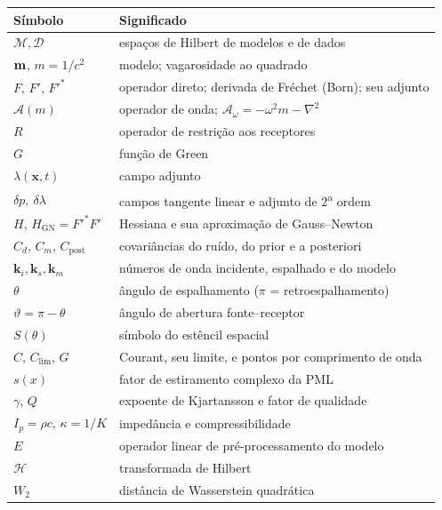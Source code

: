 \documentclass[11pt,a4paper,oneside]{report}
\begin{document}
\begin{center}
\begin{longtable}{@{}ll@{}}
\toprule
\textbf{S\'imbolo} & \textbf{Significado} \\
\midrule
\endhead
$\mathcal{M},\mathcal{D}$ & espa\c{c}os de Hilbert de modelos e de dados \\
$\mathbf{m}$, $m = 1/c^{2}$ & modelo; vagarosidade ao quadrado \\
$F$, $F'$, $F'^{*}$ & operador direto; derivada de Fr\'echet (Born); seu adjunto \\
$\mathcal{A}(m)$ & operador de onda; $\mathcal{A}_\omega = -\omega^{2}m-\nabla^{2}$ \\
$R$ & operador de restri\c{c}\~ao aos receptores \\
$G$ & fun\c{c}\~ao de Green \\
$\lambda(\mathbf{x},t)$ & campo adjunto \\
$\delta p,\ \delta\lambda$ & campos tangente linear e adjunto de 2\textsuperscript{a} ordem \\
$H$, $H_{\text{GN}} = F'^{*}F'$ & Hessiana e sua aproxima\c{c}\~ao de Gauss--Newton \\
$C_d$, $C_m$, $C_{\text{post}}$ & covari\^ancias do ru\'ido, do prior e a posteriori \\
$\mathbf{k}_i,\mathbf{k}_s,\mathbf{k}_m$ & n\'umeros de onda incidente,
  espalhado e do modelo \\
$\theta$ & \^angulo de espalhamento ($\pi$ = retroespalhamento) \\
$\vartheta = \pi-\theta$ & \^angulo de abertura fonte--receptor \\
$S(\theta)$ & s\'imbolo do est\^encil espacial \\
$C$, $C_{\lim}$, $G$ & Courant, seu limite, e pontos por comprimento de onda \\
$s(x)$ & fator de estiramento complexo da PML \\
$\gamma$, $Q$ & expoente de Kjartansson e fator de qualidade \\
$I_p = \rho c$, $\kappa = 1/K$ & imped\^ancia e compressibilidade \\
$E$ & operador linear de pr\'e-processamento do modelo \\
$\mathcal{H}$ & transformada de Hilbert \\
$W_2$ & dist\^ancia de Wasserstein quadr\'atica \\
\bottomrule
\end{longtable}
\end{center}
\end{document}
